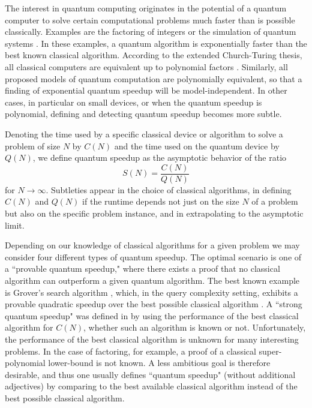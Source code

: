 The interest in quantum computing originates in the potential of a quantum computer to solve certain computational problems much faster than is possible classically. Examples are the factoring of integers \cite{Shor:94} or the simulation of quantum systems \cite{Feynman1982,Lloyd:1996fk}. In these examples, a quantum algorithm is exponentially faster than the best known classical algorithm. According to the extended Church-Turing thesis, all classical computers are equivalent up to polynomial factors \cite{Parberry:1986uo}. Similarly, all proposed models of quantum computation are polynomially equivalent, so that a finding of exponential quantum speedup will be model-independent. In other cases, in particular on small devices, or when the quantum speedup is polynomial, defining and detecting quantum speedup becomes more subtle. 

Denoting the time used by a specific classical device or algorithm to solve a problem of size $N$ by $C(N)$ and the time used on the quantum device by $Q(N)$, we  define quantum speedup as the asymptotic behavior of the ratio
\begin{equation}
S(N)=\frac{C(N)}{Q(N)}
\end{equation}
for $N\rightarrow\infty$. Subtleties appear in the choice of classical algorithms, in defining $C(N)$ and $Q(N)$ if the runtime depends not just on the size $N$ of a problem but also on the specific problem instance, and in extrapolating to the asymptotic limit. 

Depending on our knowledge of classical algorithms for a given problem we may consider four different types of quantum speedup. The optimal scenario is one of a ``provable quantum speedup," where there exists a proof that no classical algorithm can outperform a given quantum algorithm. The best known example is Grover's search algorithm \cite{Grover:97a}, 
which, in the query complexity setting, exhibits a provable quadratic speedup over the best possible classical algorithm \cite{Bennett:1997lh}.
A ``strong quantum speedup" was defined in \cite{Traub2013} by using the performance of the {best} classical algorithm for $C(N)$, whether such an algorithm is known or not. Unfortunately, the performance of the best classical algorithm is unknown for many interesting problems. In the case of factoring, for example, a proof of a classical super-polynomial lower-bound is not known. A less ambitious goal is therefore desirable, and thus one usually defines ``quantum speedup" (without additional adjectives) by comparing to the best available classical algorithm instead of the best possible classical algorithm.  

